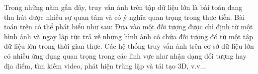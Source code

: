 \begin{abstracts}         
Trong những năm gần đây, truy vấn ảnh trên tập dữ liệu lớn là bài toán đang thu hút được nhiều sự quan tâm và có ý nghĩa quan trọng trong thực tiễn. Bài toán trên có thể phát biểu như sau: Đưa vào một đối tượng được chỉ định từ một hình ảnh và ngay lập tức trả về những hình ảnh có chứa đối tượng đó từ một tập dữ liệu lớn trong thời gian thực. Các hệ thống truy vấn ảnh trên cơ sở dữ liệu lớn có nhiều ứng dụng quan trọng trong các lĩnh vực như nhận dạng đối tượng hay địa điểm, tìm kiếm video, phát hiện trùng lặp và tái tạo 3D, v.v... 



\end{abstracts}
 